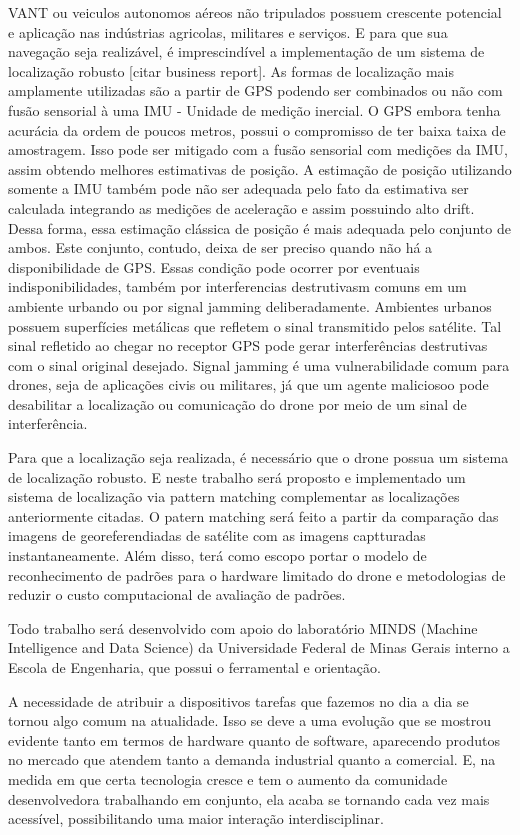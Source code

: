 
VANT ou veiculos autonomos aéreos não tripulados possuem crescente potencial e  aplicação nas indústrias agricolas,
militares e serviços. E para que sua navegação seja realizável, é imprescindível a implementação de um sistema de
localização robusto [citar business report]. As formas de localização mais amplamente utilizadas são a partir de GPS
podendo ser combinados ou não com fusão sensorial à uma IMU \-- Unidade de medição inercial. O GPS embora tenha
acurácia da ordem de poucos metros, possui o compromisso de ter baixa taixa de amostragem. Isso pode ser mitigado com a
fusão sensorial com medições da IMU, assim obtendo melhores estimativas de posição. A estimação de posição utilizando somente a IMU também pode não ser adequada pelo fato da estimativa ser calculada integrando as medições de aceleração e assim possuindo alto drift. Dessa forma, essa estimação clássica de posição é mais adequada pelo conjunto de ambos.
Este conjunto, contudo, deixa de ser preciso quando não há a disponibilidade de GPS. Essas condição pode ocorrer por
eventuais indisponibilidades, também por interferencias destrutivasm comuns em um ambiente urbando ou por signal jamming
deliberadamente. Ambientes urbanos possuem superfícies metálicas que refletem o sinal transmitido pelos satélite. Tal
sinal refletido ao chegar no receptor GPS pode gerar interferências destrutivas com o sinal original desejado. Signal jamming é uma vulnerabilidade comum para drones, seja de aplicações civis ou militares, já que um agente maliciosoo pode desabilitar a localização ou comunicação do drone por meio de um sinal de interferência. 


Para que a localização seja realizada, é necessário que o drone possua um sistema de localização robusto. E neste
trabalho será proposto e implementado um sistema de localização via pattern matching complementar as localizações
anteriormente citadas. O patern matching será feito a partir da comparação das imagens de georeferendiadas de satélite com as imagens captturadas instantaneamente. Além disso, terá como escopo portar o modelo de reconhecimento de padrões para o hardware limitado do drone e metodologias de reduzir o custo computacional de avaliação de padrões.


Todo trabalho será desenvolvido com apoio do laboratório MINDS (Machine Intelligence and Data Science) da Universidade Federal de Minas Gerais interno a Escola de Engenharia, que possui o ferramental e orientação.

A necessidade de atribuir a dispositivos tarefas que fazemos no dia a dia se tornou algo comum na atualidade. Isso se deve a uma evolução que se mostrou evidente tanto em termos de hardware quanto de software, aparecendo produtos no mercado que atendem tanto a demanda industrial quanto a comercial. E, na medida em que certa tecnologia cresce e tem o aumento da comunidade desenvolvedora trabalhando em conjunto, ela acaba se tornando cada vez mais acessível, possibilitando uma maior interação interdisciplinar.

